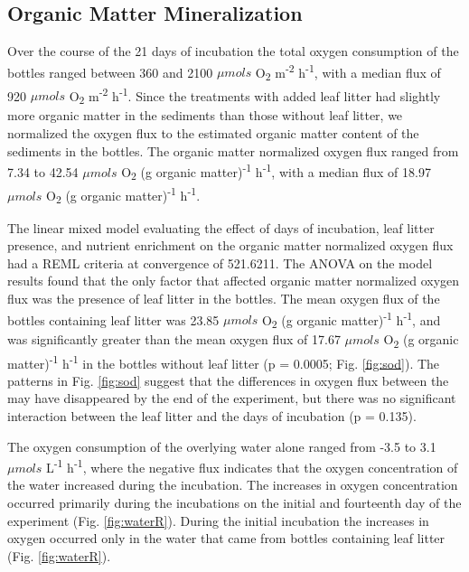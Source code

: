 \subsection{Organic Matter Mineralization}

Over the course of the 21 days of incubation the total oxygen consumption of the bottles ranged between 360 and 2100 $\mu mols$ O\textsubscript{2} m\textsuperscript{-2} h\textsuperscript{-1}, with a median flux of 920 $\mu mols$ O\textsubscript{2} m\textsuperscript{-2} h\textsuperscript{-1}. Since the treatments with added leaf litter had slightly more organic matter in the sediments than those without leaf litter, we normalized the oxygen flux to the estimated organic matter content of the sediments in the bottles. The organic matter normalized oxygen flux ranged from 7.34 to 42.54 $\mu mols$ O\textsubscript{2} (g organic matter)\textsuperscript{-1} h\textsuperscript{-1}, with a median flux of 18.97 $\mu mols$ O\textsubscript{2} (g organic matter)\textsuperscript{-1} h\textsuperscript{-1}.

The linear mixed model evaluating the effect of days of incubation, leaf litter presence, and nutrient enrichment on the organic matter normalized oxygen flux had a REML criteria at convergence of 521.6211. The ANOVA on the model results found that the only factor that affected organic matter normalized oxygen flux was the presence of leaf litter in the bottles. The mean oxygen flux of the bottles containing leaf litter was 23.85 $\mu mols$ O\textsubscript{2} (g organic matter)\textsuperscript{-1} h\textsuperscript{-1}, and was significantly greater than the mean oxygen flux of 17.67 $\mu mols$ O\textsubscript{2} (g organic matter)\textsuperscript{-1} h\textsuperscript{-1} in the bottles without leaf litter (p = 0.0005; Fig. \ref{fig:sod}).  The patterns in Fig. \ref{fig:sod} suggest that the differences in oxygen flux between the may have disappeared by the end of the experiment, but there was no significant interaction between the leaf litter and the days of incubation (p = 0.135).

The oxygen consumption of the overlying water alone ranged from -3.5 to 3.1 $\mu mols$ L\textsuperscript{-1} h\textsuperscript{-1}, where the negative flux indicates that the oxygen concentration of the water increased during the incubation.  The increases in oxygen concentration occurred primarily during the incubations on the initial and fourteenth day of the experiment (Fig. \ref{fig:waterR}). During the initial incubation the increases in oxygen occurred only in the water that came from bottles containing leaf litter (Fig. \ref{fig:waterR}).



